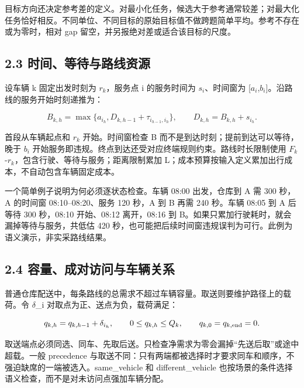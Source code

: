 \documentclass[UTF8,10pt,a4paper,fontset=fandol]{ctexart}
\begin{document}
目标方向还决定参考差的定义。对最小化任务，候选大于参考通常较差；对最大化任务恰好相反。不同单位、不同目标的原始目标值不做跨题简单平均。参考不存在或为零时，相对 gap 留空，并另报绝对差或适合该目标的尺度。


\subsection*{2.3 时间、等待与路线资源}


设车辆 k 固定出发时刻为 \ensuremath{r_{k}}，服务点 i 的服务时间为 \ensuremath{s_{i}}、时间窗为 [\ensuremath{a_{i}},\ensuremath{b_{i}}]。沿路线的服务开始时刻递推为：


\begin{equation}
B_{k,h}=\max\{a_{i_h},D_{k,h-1}+\tau_{i_{h-1},i_h}\},
\qquad D_{k,h}=B_{k,h}+s_{i_h}.
\end{equation}

首段从车辆起点和 \ensuremath{r_{k}} 开始。时间窗检查 B 而不是到达时刻；提前到达可以等待，晚于 \ensuremath{b_{i}} 开始服务即违规。终点到达还受对应终端规则约束。路线时长限制使用 \ensuremath{F_{k}}-\ensuremath{r_{k}}，包含行驶、等待与服务；距离限制累加 L；成本预算按输入定义累加出行成本，不自动包含车辆固定成本。


一个简单例子说明为何必须逐状态检查。车辆 08:00 出发，仓库到 A 需 300 秒，A 的时间窗 08:10–08:20、服务 120 秒，A 到 B 再需 240 秒。车辆 08:05 到 A 后等待 300 秒，08:10 开始、08:12 离开，08:16 到 B。如果只累加行驶耗时，就会漏掉等待与服务，共低估 420 秒，也可能把后续时间窗违规误判为可行。此例为语义演示，非实采路线结果。


\subsection*{2.4 容量、成对访问与车辆关系}


普通仓库配送中，每条路线的总需求不超过车辆容量。取送则要维护路径上的载荷。令 \ensuremath{\delta}\_\allowbreak{}i 对取点为正、送点为负，载荷满足：


\begin{equation}
q_{k,h}=q_{k,h-1}+\delta_{i_h},
\qquad 0\le q_{k,h}\le Q_k,\qquad
q_{k,0}=q_{k,\rm end}=0.
\end{equation}

取送端点必须同选、同车、先取后送。只检查净需求为零会漏掉“先送后取”或途中超载。一般 precedence 与取送不同：只有两端都被选择时才要求同车和顺序，不强迫缺席的一端被选入。same\_\allowbreak{}vehicle 和 different\_\allowbreak{}vehicle 也按场景的条件选择语义检查，而不是对未访问点强加车辆分配。
\end{document}
